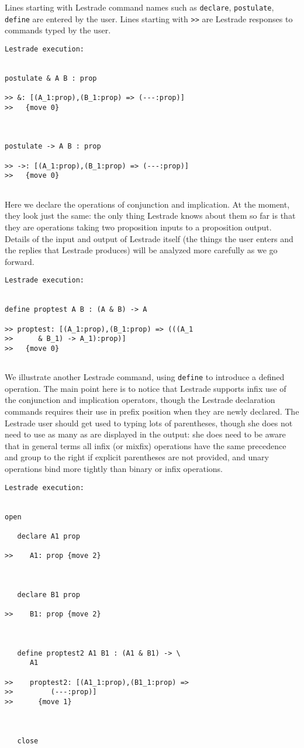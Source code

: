 \documentclass[12pt]{article}
\begin{document}
Lines starting with Lestrade command names such as {\tt declare}, {\tt postulate}, {\tt define} are entered by the user.  Lines starting with {\tt >>} are Lestrade responses to commands typed by the user.

\begin{verbatim}Lestrade execution:


postulate & A B : prop

>> &: [(A_1:prop),(B_1:prop) => (---:prop)]
>>   {move 0}



postulate -> A B : prop

>> ->: [(A_1:prop),(B_1:prop) => (---:prop)]
>>   {move 0}


\end{verbatim}

Here we declare the operations of conjunction and implication.  At the moment, they look just the same:  the only thing Lestrade knows about them so far is that they are operations taking two proposition inputs to a proposition output.  Details of the input and output of Lestrade itself (the things the user enters and the replies that Lestrade produces) will be analyzed more carefully as we go forward.

\begin{verbatim}Lestrade execution:


define proptest A B : (A & B) -> A

>> proptest: [(A_1:prop),(B_1:prop) => (((A_1
>>      & B_1) -> A_1):prop)]
>>   {move 0}


\end{verbatim}

We illustrate another Lestrade command, using {\tt define} to introduce a defined operation.  The main point here is to notice that Lestrade supports
infix use of the conjunction and implication operators, though the Lestrade declaration commands requires their use in prefix position when they are newly declared.  The Lestrade user should get used to typing lots of parentheses, though she does not need to use as many as are displayed in the output:  she does need to be aware that in general terms all infix (or mixfix) operations have the same precedence and group to the right if explicit parentheses are not provided, and unary operations bind more tightly than binary or infix operations.

\begin{verbatim}Lestrade execution:


open

   declare A1 prop

>>    A1: prop {move 2}



   declare B1 prop

>>    B1: prop {move 2}



   define proptest2 A1 B1 : (A1 & B1) -> \
      A1

>>    proptest2: [(A1_1:prop),(B1_1:prop) =>
>>         (---:prop)]
>>      {move 1}



   close
\end{verbatim}
\end{document}
